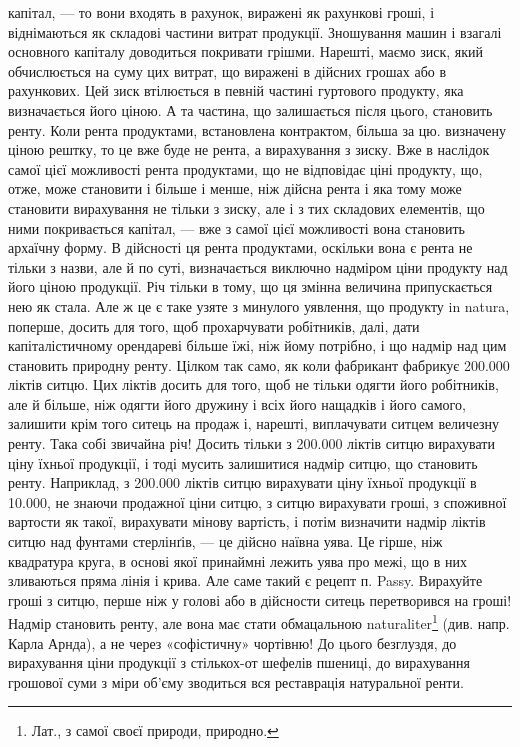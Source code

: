 \parcont{}  %
капітал, — то вони входять в рахунок, виражені як рахункові гроші, і віднімаються
як складові частини витрат продукції. Зношування машин і взагалі
основного капіталу доводиться покривати грішми. Нарешті, маємо зиск, який
обчислюється на суму цих витрат, що виражені в дійсних грошах або в рахункових.
Цей зиск втілюється в певній частині гуртового продукту, яка визначається
його ціною. А та частина, що залишається після цього, становить ренту.
Коли рента продуктами, встановлена контрактом, більша за цю. визначену ціною
рештку, то це вже буде не рента, а вирахування з зиску. Вже в наслідок самої
цієї можливості рента продуктами, що не відповідає ціні продукту, що, отже,
може становити і більше і менше, ніж дійсна рента і яка тому може становити
вирахування не тільки з зиску, але і з тих складових елементів, що ними покривається
капітал, — вже з самої цієї можливості вона становить архаїчну
форму. В дійсності ця рента продуктами, оскільки вона є рента не тільки з
назви, але й по суті, визначається виключно надміром ціни продукту над його
ціною продукції. Річ тільки в тому, що ця змінна величина припускається нею
як стала. Але ж це є таке узяте з минулого уявлення, що продукту in natura,
поперше, досить для того, щоб прохарчувати робітників, далі, дати капіталістичному
орендареві більше їжі, ніж йому потрібно, і що надмір над цим становить
природну ренту. Цілком так само, як коли фабрикант фабрикує \num{200.000}
ліктів ситцю. Цих ліктів досить для того, щоб не тільки одягти його робітників,
але й більше, ніж одягти його дружину і всіх його нащадків і його самого, залишити
крім того ситець на продаж і, нарешті, виплачувати ситцем величезну
ренту. Така собі звичайна річ! Досить тільки з \num{200.000} ліктів ситцю вирахувати
ціну їхньої продукції, і тоді мусить залишитися надмір ситцю, що становить
ренту. Наприклад, з \num{200.000} ліктів ситцю вирахувати ціну їхньої продукції
в \num{10.000}, не знаючи продажної ціни ситцю, з ситцю вирахувати
гроші, з споживної вартости як такої, вирахувати мінову вартість, і потім визначити
надмір ліктів ситцю над фунтами стерлінґів, — це дійсно наївна уява.
Це гірше, ніж квадратура круга, в основі якої принаймні лежить уява про
межі, що в них зливаються пряма лінія і крива. Але саме такий є рецепт п.
Passy. Вирахуйте гроші з ситцю, перше ніж у голові або в дійсности ситець
перетворився на гроші! Надмір становить ренту, але вона має стати обмацальною
naturaliter\footnote*{
Лат., з самої своєї природи, природно. 
} (див. напр. Карла Арнда), а не через «софістичну» чортівню!
До цього безглуздя, до вирахування ціни продукції з стількох-от шефелів пшениці,
до вирахування грошової суми з міри об’єму зводиться вся реставрація
натуральної ренти.

